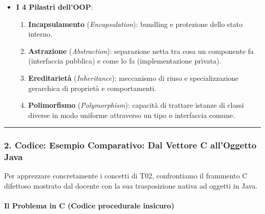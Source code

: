 \documentclass[11pt,a4paper]{article}
\newcommand{\passthrough}[1]{#1}
\providecommand{\tightlist}{\setlength{\itemsep}{0pt}\setlength{\parskip}{0pt}}
\begin{document}
\begin{itemize}
  \begin{itemize}
  \tightlist
  \item
    \textbf{Associazione standard}: linea continua con cardinalità (es.
    \passthrough{\lstinline!1!} a \passthrough{\lstinline!0..n!} tra
    \passthrough{\lstinline!Insurance!} e
    \passthrough{\lstinline!Vehicle!}).
  \item
    \textbf{Ereditarietà (Generalizzazione)}: freccia con punta
    triangolare vuota orientata verso la superclasse
    (\passthrough{\lstinline!Car!} estende
    \passthrough{\lstinline!Vehicle!}, \passthrough{\lstinline!Truck!}
    estende \passthrough{\lstinline!Vehicle!}).
  \end{itemize}
\item
  \textbf{I 4 Pilastri dell'OOP}:

  \begin{enumerate}
  \def\labelenumi{\arabic{enumi}.}
  \tightlist
  \item
    \textbf{Incapsulamento} (\emph{Encapsulation}): bundling e
    protezione dello stato interno.
  \item
    \textbf{Astrazione} (\emph{Abstraction}): separazione netta tra cosa
    un componente fa (interfaccia pubblica) e come lo fa
    (implementazione privata).
  \item
    \textbf{Ereditarietà} (\emph{Inheritance}): meccanismo di riuso e
    specializzazione gerarchica di proprietà e comportamenti.
  \item
    \textbf{Polimorfismo} (\emph{Polymorphism}): capacità di trattare
    istanze di classi diverse in modo uniforme attraverso un tipo o
    interfaccia comune.
  \end{enumerate}
\end{itemize}

\begin{center}\rule{0.5\linewidth}{0.5pt}\end{center}

\subsubsection{2. Codice: Esempio Comparativo: Dal Vettore C all'Oggetto
Java}\label{codice-esempio-comparativo-dal-vettore-c-alloggetto-java}

Per apprezzare concretamente i concetti di T02, confrontiamo il
frammento C difettoso mostrato dal docente con la sua trasposizione
nativa ad oggetti in Java.

\paragraph{Il Problema in C (Codice procedurale
insicuro)}\label{il-problema-in-c-codice-procedurale-insicuro}
\end{document}
